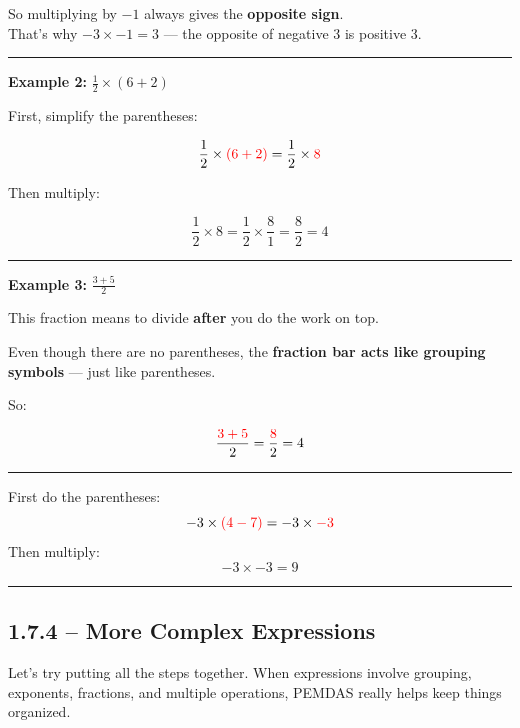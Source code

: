 \documentclass[
  letterpaper,
  DIV=11,
  numbers=noendperiod]{scrreprt}
\begin{document}
So multiplying by \(-1\) always gives the \textbf{opposite sign}.\\
That's why \(-3 \times -1 = 3\) --- the opposite of negative 3 is
positive 3.

\begin{center}\rule{0.5\linewidth}{0.5pt}\end{center}

\textbf{Example 2:} \(\frac{1}{2} \times (6 + 2)\)

First, simplify the parentheses:

\[
\frac{1}{2} \times \color{red}(6 + 2)\color{black} = \frac{1}{2} \times \color{red}8
\]

Then multiply:

\[
\frac{1}{2} \times 8 = \frac{1}{2} \times \frac{8}{1} = \frac{8}{2} = 4
\]

\begin{center}\rule{0.5\linewidth}{0.5pt}\end{center}

\textbf{Example 3:} \(\frac{3 + 5}{2}\)

This fraction means to divide \textbf{after} you do the work on top.

Even though there are no parentheses, the \textbf{fraction bar acts like
grouping symbols} --- just like parentheses.

So:

\[
\frac{\color{red}{3 + 5}}{2} = \frac{\color{red}{8}}{2} = 4
\]

\begin{center}\rule{0.5\linewidth}{0.5pt}\end{center}

First do the parentheses: \[
-3 \times \color{red}(4 - 7) \color{black} = -3 \times \color{red}{-3}
\] Then multiply: \[
-3 \times -3 = 9
\]

\begin{center}\rule{0.5\linewidth}{0.5pt}\end{center}

\subsection*{1.7.4 -- More Complex
Expressions}\label{more-complex-expressions}

Let's try putting all the steps together. When expressions involve
grouping, exponents, fractions, and multiple operations, PEMDAS really
helps keep things organized.
\end{document}

